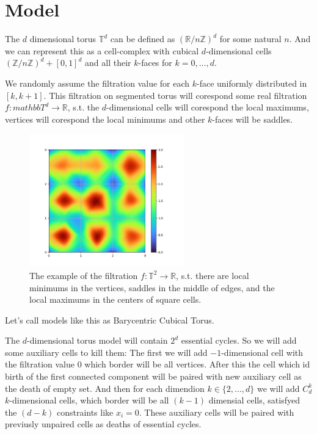 \documentclass{article}
\begin{document}
\section{Model}
\par The $d$ dimensional torus $\mathbb{T}^d$ can be defined as $\left(\mathbb{R}/n\mathbb{Z}\right)^d$ for some natural $n$. And we can represent this as a cell-complex with cubical $d$-dimensional cells $\left(\mathbb{Z}/n\mathbb{Z}\right)^d + [0, 1]^d$ and all their $k$-faces for $k=0, ..., d$.
\par We randomly assume the filtration value for each $k$-face uniformly distributed in $[k, k+1]$. This filtration on segmented torus will corespond some real filtration $f: mathbb{T}^d\to\mathbb{R}$, s.t. the $d$-dimensional cells will corespond the local maximums, vertices will corespond the local minimums and other $k$-faces will be saddles.
\begin{figure}[h!]
    \centering
    \includegraphics[width=0.6\textwidth]{pics/extended torus scores/2d-example.png}
    \caption{The example of the filtration $f:\mathbb{T}^2\to\mathbb{R}$, s.t. there are local minimums in the vertices, saddles in the middle of edges, and the local maximums in the centers of square cells.}
    \label{fig:example2d}
\end{figure}
\par Let's call models like this as Barycentric Cubical Torus.
\par The $d$-dimensional torus model will contain $2^d$ essential cycles. So we will add some auxiliary cells to kill them:
The first we will add $-1$-dimensional cell with the filtration value 0 which border will be all vertices. After this the cell which id birth of the first connected component will be paired with new auxiliary cell as the death of empty set. 
And then for each dimendion $k\in\{2, ..., d\}$ we will add $C_d^k$ $k$-dimensional cells, which border will be all $(k-1)$ dimensial cells, satisfyed the $(d - k)$ constraints like $x_i = 0$. These auxiliary cells will be paired with previusly unpaired cells as deaths of essential cycles.
\end{document}
